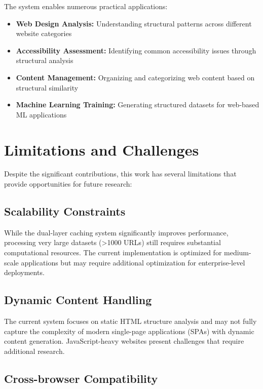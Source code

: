 The {\name} system enables numerous practical applications:

\begin{itemize}
\item \textbf{Web Design Analysis:} Understanding structural patterns across different website categories
\item \textbf{Accessibility Assessment:} Identifying common accessibility issues through structural analysis
\item \textbf{Content Management:} Organizing and categorizing web content based on structural similarity
\item \textbf{Machine Learning Training:} Generating structured datasets for web-based ML applications
\end{itemize}

\section{Limitations and Challenges}
\label{sec:limitations}

Despite the significant contributions, this work has several limitations that provide opportunities for future research:

\subsection{Scalability Constraints}

While the dual-layer caching system significantly improves performance, processing very large datasets (>1000 URLs) still requires substantial computational resources. The current implementation is optimized for medium-scale applications but may require additional optimization for enterprise-level deployments.

\subsection{Dynamic Content Handling}

The current system focuses on static HTML structure analysis and may not fully capture the complexity of modern single-page applications (SPAs) with dynamic content generation. JavaScript-heavy websites present challenges that require additional research.

\subsection{Cross-browser Compatibility}

